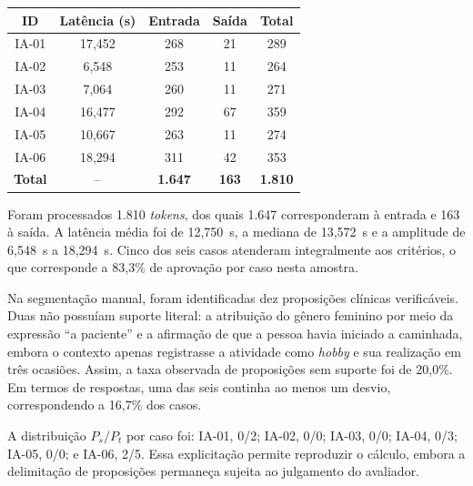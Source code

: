 \begin{quadro}[H]
\centering
\caption{Latência e quantidade de \textit{tokens} por caso}
\label{qua:desempenho-ia}
\small
\renewcommand{\arraystretch}{1.15}
\setlength{\tabcolsep}{8pt}
\begin{tabular}{|c|c|c|c|c|}
\hline
\textbf{ID} & \textbf{Latência (s)} & \textbf{Entrada} & \textbf{Saída} & \textbf{Total} \\ \hline
IA-01 & 17,452 & 268 & 21 & 289 \\ \hline
IA-02 & 6,548 & 253 & 11 & 264 \\ \hline
IA-03 & 7,064 & 260 & 11 & 271 \\ \hline
IA-04 & 16,477 & 292 & 67 & 359 \\ \hline
IA-05 & 10,667 & 263 & 11 & 274 \\ \hline
IA-06 & 18,294 & 311 & 42 & 353 \\ \hline
\textbf{Total} & -- & \textbf{1.647} & \textbf{163} & \textbf{1.810} \\ \hline
\end{tabular}
\par\vspace{0.8cm}
\end{quadro}

Foram processados 1.810 \textit{tokens}, dos quais 1.647 corresponderam à entrada e 163 à saída. A latência média foi de 12,750~s, a mediana de 13,572~s e a amplitude de 6,548~s a 18,294~s. Cinco dos seis casos atenderam integralmente aos critérios, o que corresponde a 83,3\% de aprovação por caso nesta amostra.

Na segmentação manual, foram identificadas dez proposições clínicas verificáveis. Duas não possuíam suporte literal: a atribuição do gênero feminino por meio da expressão ``a paciente'' e a afirmação de que a pessoa havia iniciado a caminhada, embora o contexto apenas registrasse a atividade como \textit{hobby} e sua realização em três ocasiões. Assim, a taxa observada de proposições sem suporte foi de 20,0\%. Em termos de respostas, uma das seis continha ao menos um desvio, correspondendo a 16,7\% dos casos.

A distribuição $P_s/P_t$ por caso foi: IA-01, 0/2; IA-02, 0/0; IA-03, 0/0; IA-04, 0/3; IA-05, 0/0; e IA-06, 2/5. Essa explicitação permite reproduzir o cálculo, embora a delimitação de proposições permaneça sujeita ao julgamento do avaliador.

